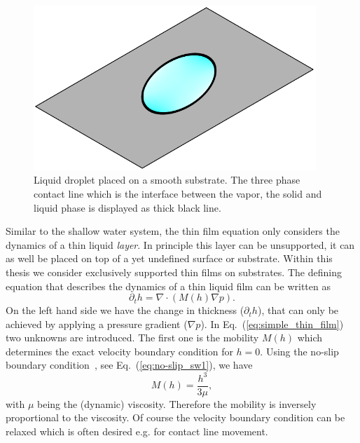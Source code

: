 \begin{figure}
    \centering
    \includegraphics[width=0.95\textwidth]{graphics/contact_line.pdf}
    \caption{Liquid droplet placed on a smooth substrate.
    The three phase contact line which is the interface between the vapor, the solid and liquid phase is displayed as thick black line.}
    \label{fig:contact_line_drop}
\end{figure}
Similar to the shallow water system, the thin film equation only considers the dynamics of a thin liquid \textit{layer}. 
In principle this layer can be unsupported, it can as well be placed on top of a yet undefined surface or substrate.
Within this thesis we consider exclusively supported thin films on substrates.
The defining equation that describes the dynamics of a thin liquid film can be written as~\cite{thielePatternedDepositionMoving2014, oronLongscaleEvolutionThin1997, crasterDynamicsStabilityThin2009, bonnWettingSpreading2009} 
\begin{equation}\label{eq:simple_thin_film}
    \partial_t h = \nabla\cdot\left(M(h)\nabla p\right).
\end{equation}
On the left hand side we have the change in thickness ($\partial_t h$), that can only be achieved by applying a pressure gradient ($\nabla p$).
In Eq.~(\ref{eq:simple_thin_film}) two unknowns are introduced.
The first one is the mobility $M(h)$ which determines the exact velocity boundary condition for $h=0$.
Using the no-slip boundary condition~\cite{beckerThinfilmEquationRecent2005}, see Eq.~(\ref{eq:no-slip_sw1}), we have 
\begin{equation}\label{eq:no-slip-mobility}
    M(h) = \frac{h^3}{3\mu},
\end{equation}
with $\mu$ being the (dynamic) viscosity. 
Therefore the mobility is inversely proportional to the viscosity.
Of course the velocity boundary condition can be relaxed which is often desired e.g. for contact line movement.
